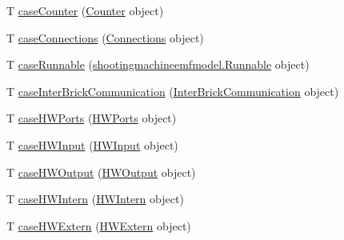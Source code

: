\begin{DoxyCompactItemize}
\item 
T \hyperlink{classshootingmachineemfmodel_1_1util_1_1_shootingmachineemfmodel_switch_3_01_t_01_4_a6a84f14253408dda219e9c7222f5a595}{case\-Counter} (\hyperlink{interfaceshootingmachineemfmodel_1_1_counter}{Counter} object)
\item 
T \hyperlink{classshootingmachineemfmodel_1_1util_1_1_shootingmachineemfmodel_switch_3_01_t_01_4_abed3d0e0836484a6728f1cb5a8a29178}{case\-Connections} (\hyperlink{interfaceshootingmachineemfmodel_1_1_connections}{Connections} object)
\item 
T \hyperlink{classshootingmachineemfmodel_1_1util_1_1_shootingmachineemfmodel_switch_3_01_t_01_4_a91883e392282871cde1dda5d123fcfe0}{case\-Runnable} (\hyperlink{interfaceshootingmachineemfmodel_1_1_runnable}{shootingmachineemfmodel.\-Runnable} object)
\item 
T \hyperlink{classshootingmachineemfmodel_1_1util_1_1_shootingmachineemfmodel_switch_3_01_t_01_4_aa07f358b7740c8e40d949a0bfc4cbb9f}{case\-Inter\-Brick\-Communication} (\hyperlink{interfaceshootingmachineemfmodel_1_1_inter_brick_communication}{Inter\-Brick\-Communication} object)
\item 
T \hyperlink{classshootingmachineemfmodel_1_1util_1_1_shootingmachineemfmodel_switch_3_01_t_01_4_af6e65bc9005b6810313001f19bad9ac3}{case\-H\-W\-Ports} (\hyperlink{interfaceshootingmachineemfmodel_1_1_h_w_ports}{H\-W\-Ports} object)
\item 
T \hyperlink{classshootingmachineemfmodel_1_1util_1_1_shootingmachineemfmodel_switch_3_01_t_01_4_a279ce44e559e1dbce0429dff2f5d05f0}{case\-H\-W\-Input} (\hyperlink{interfaceshootingmachineemfmodel_1_1_h_w_input}{H\-W\-Input} object)
\item 
T \hyperlink{classshootingmachineemfmodel_1_1util_1_1_shootingmachineemfmodel_switch_3_01_t_01_4_a16753eaf6e355562a1a750a7a390b30d}{case\-H\-W\-Output} (\hyperlink{interfaceshootingmachineemfmodel_1_1_h_w_output}{H\-W\-Output} object)
\item 
T \hyperlink{classshootingmachineemfmodel_1_1util_1_1_shootingmachineemfmodel_switch_3_01_t_01_4_ad03e0f30218a8beb379a834d0559cd56}{case\-H\-W\-Intern} (\hyperlink{interfaceshootingmachineemfmodel_1_1_h_w_intern}{H\-W\-Intern} object)
\item 
T \hyperlink{classshootingmachineemfmodel_1_1util_1_1_shootingmachineemfmodel_switch_3_01_t_01_4_a53fa882462f46208c216b1916e8d8566}{case\-H\-W\-Extern} (\hyperlink{interfaceshootingmachineemfmodel_1_1_h_w_extern}{H\-W\-Extern} object)
\item 

\end{DoxyCompactItemize}
